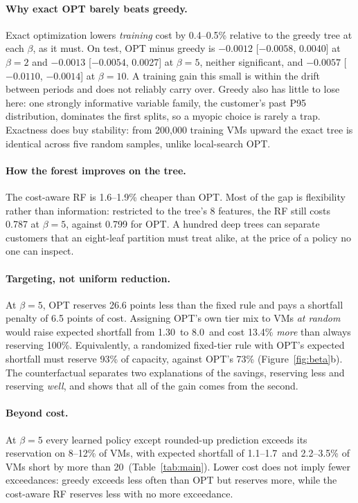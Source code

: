 \documentclass[10pt]{article}
\newcommand{\pp}{\,\text{pp}}
\begin{document}
\paragraph{Why exact OPT barely beats greedy.} Exact optimization lowers \emph{training} cost by 0.4--0.5\% relative to the greedy tree at each $\beta$, as it must. On test, OPT minus greedy is $-0.0012$ [$-0.0058$, 0.0040] at $\beta=2$ and $-0.0013$ [$-0.0054$, 0.0027] at $\beta=5$, neither significant, and $-0.0057$ [$-0.0110$, $-0.0014$] at $\beta=10$. A training gain this small is within the drift between periods and does not reliably carry over. Greedy also has little to lose here: one strongly informative variable family, the customer's past P95 distribution, dominates the first splits, so a myopic choice is rarely a trap. Exactness does buy stability: from 200,000 training VMs upward the exact tree is identical across five random samples, unlike local-search OPT.

\paragraph{How the forest improves on the tree.} The cost-aware RF is 1.6--1.9\% cheaper than OPT. Most of the gap is flexibility rather than information: restricted to the tree's 8 features, the RF still costs 0.787 at $\beta=5$, against 0.799 for OPT. A hundred deep trees can separate customers that an eight-leaf partition must treat alike, at the price of a policy no one can inspect.

\paragraph{Targeting, not uniform reduction.} At $\beta=5$, OPT reserves 26.6 points less than the fixed rule and pays a shortfall penalty of 6.5 points of cost. Assigning OPT's own tier mix to VMs \emph{at random} would raise expected shortfall from 1.30\pp{} to 8.0\pp{} and cost 13.4\% \emph{more} than always reserving 100\%. Equivalently, a randomized fixed-tier rule with OPT's expected shortfall must reserve 93\% of capacity, against OPT's 73\% (Figure~\ref{fig:beta}b). The counterfactual separates two explanations of the savings, reserving less and reserving \emph{well}, and shows that all of the gain comes from the second.

\paragraph{Beyond cost.} At $\beta=5$ every learned policy except rounded-up prediction exceeds its reservation on 8--12\% of VMs, with expected shortfall of 1.1--1.7\pp{} and 2.2--3.5\% of VMs short by more than 20\pp{} (Table~\ref{tab:main}). Lower cost does not imply fewer exceedances: greedy exceeds less often than OPT but reserves more, while the cost-aware RF reserves less with no more exceedance.
\end{document}
